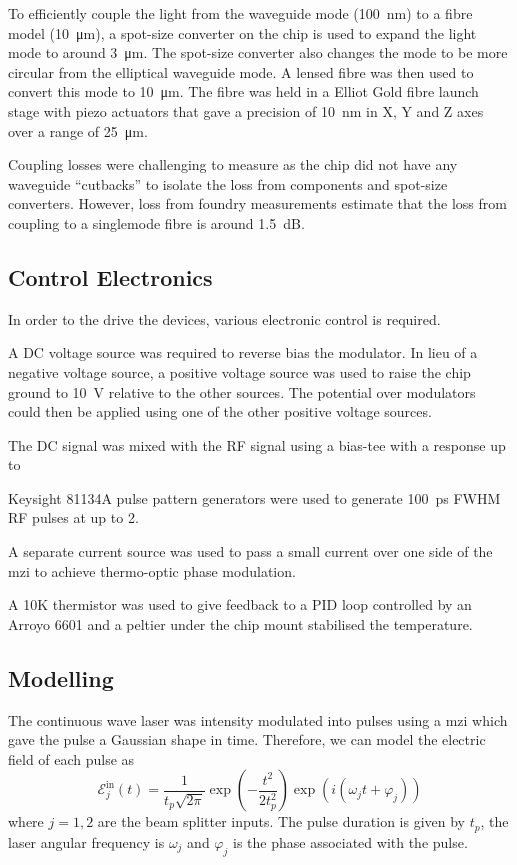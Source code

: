 {To efficiently couple the light from the waveguide mode (\SI{100}{\nm}) to a fibre model (\SI{10}{\micro\meter}), a spot-size converter on the chip is used to expand the light mode to around \SI{3}{\micro\meter}. The spot-size converter also changes the mode to be more circular from the elliptical waveguide mode. A lensed fibre was then used to convert this mode to \SI{10}{\micro\meter}. The fibre was held in a Elliot Gold fibre launch stage with piezo actuators that gave a precision of \SI{10}{\nm} in X, Y and Z axes over a range of \SI{25}{\micro\meter}.

Coupling losses were challenging to measure as the chip did not have any waveguide ``cutbacks'' to isolate the loss from components and spot-size converters.  However, loss from foundry measurements estimate that the loss from coupling to a singlemode fibre is around \SI{1.5}{dB}.

\subsection{Control Electronics}

In order to the drive the devices, various electronic control is required. 

A DC voltage source was required to reverse bias the modulator. In lieu of a negative voltage source, a positive voltage source was used to raise the chip ground to \SI{10}{\V} relative to the other sources. The potential over modulators could then be applied using one of the other positive voltage sources.

The DC signal was mixed with the RF signal using a bias-tee with a response up to 

Keysight 81134A pulse pattern generators were used to generate \SI{100}{\ps} \ac{FWHM} RF pulses at up to \SI{2}{\Vpp}.

A separate current source was used to pass a small current over one side of the \ac{mzi} to achieve thermo-optic phase modulation. 

A 10K thermistor was used to give feedback to a PID loop controlled by an Arroyo 6601 and a peltier under the chip mount stabilised the temperature.

\subsection{Modelling}

The continuous wave laser was intensity modulated into pulses using a \ac{mzi} which gave the pulse a Gaussian shape in time. Therefore, we can model the electric field of each pulse as
\begin{equation}
	\mathcal{E}_j^\text{in}(t) = \frac{1}{t_p\sqrt{2\pi}} \exp{\left(-\frac{t^2}{2 t_p^2}\right)} \exp{\left(i(\omega_j t + \varphi_j)\right)}
\end{equation}
where $j = 1,2$ are the beam splitter inputs. The pulse duration is given by $t_p$, the laser angular frequency is $\omega_j$ and $\varphi_j$ is the phase associated with the pulse.

}
